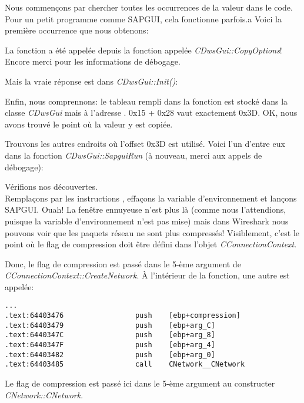 Nous commençons par chercher toutes les occurrences de la valeur  dans le
code.
Pour un petit programme comme SAPGUI, cela fonctionne parfois.a Voici la première
occurrence que nous obtenons:



La fonction a été appelée depuis la fonction appelée \emph{CDwsGui::CopyOptions}!
Encore merci pour les informations de débogage.

Mais la vraie réponse est dans \emph{CDwsGui::Init()}:



Enfin, nous comprennons: le tableau rempli dans la fonction 
est stocké dans la classe \emph{CDwsGui} mais à l'adresse . 0x15 + 0x28
vaut exactement 0x3D. OK, nous avons trouvé le point où la valeur y est copiée.

Trouvons les autres endroits où l'offset 0x3D est utilisé.
Voici l'un d'entre eux dans la fonction \emph{CDwsGui::SapguiRun} (à nouveau, merci
aux appels de débogage):



Vérifions nos découvertes. \\
Remplaçons  par les instructions ,
effaçons la variable d'environnement \TDWNC et lançons SAPGUI. Ouah! La fenêtre ennuyeuse
n'est plus là (comme nous l'attendions, puisque la variable d'environnement n'est
pas mise) mais dans Wireshark nous pouvons voir que les paquets réseau ne sont plus
compressés!
Visiblement, c'est le point où le flag de compression doit être défini dans l'objet
\emph{CConnectionContext}.

Donc, le flag de compression est passé dans le 5-ème argument de \emph{CConnectionContext::CreateNetwork}.
À l'intérieur de la fonction, une autre est appelée:

\begin{lstlisting}[style=customasmx86]
...
.text:64403476                 push    [ebp+compression]
.text:64403479                 push    [ebp+arg_C]
.text:6440347C                 push    [ebp+arg_8]
.text:6440347F                 push    [ebp+arg_4]
.text:64403482                 push    [ebp+arg_0]
.text:64403485                 call    CNetwork__CNetwork
\end{lstlisting}

Le flag de compression est passé ici dans le 5-ème argument au constructer \emph{CNetwork::CNetwork}.

